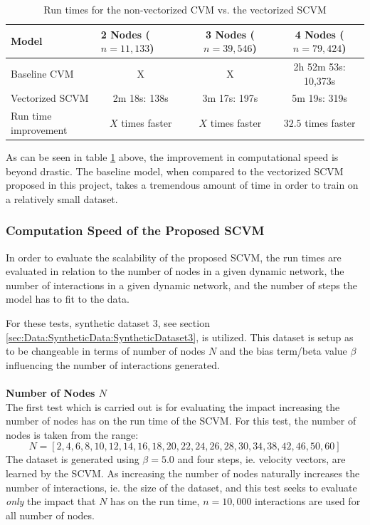 \begin{table}[H]
\centering
\begin{tabular}{|l|ccc|}
\hline
Model           & \multicolumn{1}{l}{2 Nodes ($n = 11,133$)} & 3 Nodes ($n = 39,546$)& 4 Nodes ($n = 79,424$)         \\ \hline
Baseline CVM    & X                         & X             & 2h 52m 53s: 10,373s    \\
Vectorized SCVM & 2m 18s: 138s              & 3m 17s: 197s  & 5m 19s: 319s    \\ 
Run time improvement & $X$ times faster             & $X$ times faster  & $32.5$ times faster   \\ \hline
\end{tabular}
\caption{Run times for the non-vectorized CVM vs. the vectorized SCVM}
\label{tab:RuntimeBaseline}
\end{table}
\noindent As can be seen in table \ref{tab:RuntimeBaseline} above, the improvement in computational speed is beyond drastic.
The baseline model, when compared to the vectorized SCVM proposed in this project, takes a tremendous amount of time in order to train on a relatively small dataset.



\subsubsection{Computation Speed of the Proposed SCVM}
\label{sec:ResearchQuestion2:ComputationSpeed}
In order to evaluate the scalability of the proposed SCVM, the run times are evaluated in relation to the number of nodes in a given dynamic network, the number of interactions in a given dynamic network, and the number of steps the model has to fit to the data.

For these tests, synthetic dataset 3, see section \ref{sec:Data:SyntheticData:SyntheticDataset3}, is utilized.
This dataset is setup as to be changeable in terms of number of nodes $N$ and the bias term/beta value $\beta$ influencing the number of interactions generated.
\\\\
\textbf{Number of Nodes $N$}
\\
The first test which is carried out is for evaluating the impact increasing the number of nodes has on the run time of the SCVM.
For this test, the number of nodes is taken from the range:
\begin{equation}
    N = [2, 4, 6, 8, 10, 12, 14, 16, 18, 20, 22, 24, 26, 28, 30, 34, 38, 42, 46, 50, 60]
\end{equation}
The dataset is generated using $\beta = 5.0$ and four steps, ie. velocity vectors, are learned by the SCVM.
As increasing the number of nodes naturally increases the number of interactions, ie. the size of the dataset, and this test seeks to evaluate \textit{only} the impact that $N$ has on the run time, $n = 10,000$ interactions are used for all number of nodes.

